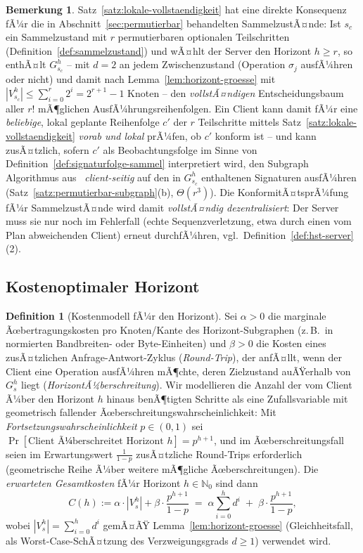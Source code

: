 ﻿\documentclass[a4paper,12pt]{article}
\theoremstyle{definition}
\newtheorem{definition}{Definition}
\newtheorem{bemerkung}{Bemerkung}
\begin{document}
\begin{bemerkung}
	\label{bem:hst-permutierbar}
	Satz~\ref{satz:lokale-vollstaendigkeit} hat eine direkte Konsequenz fÃ¼r die in
	Abschnitt~\ref{sec:permutierbar} behandelten SammelzustÃ¤nde: Ist $s_c$ ein
	Sammelzustand mit $r$ permutierbaren optionalen Teilschritten
	(Definition~\ref{def:sammelzustand}) und wÃ¤hlt der Server den Horizont $h\ge r$, so
	enthÃ¤lt $G_{s_c}^h$ -- mit $d=2$ an jedem Zwischenzustand (Operation $\sigma_j$
	ausfÃ¼hren oder nicht) und damit nach Lemma~\ref{lem:horizont-groesse} mit
	$|V_{s_c}^h|\le\sum_{i=0}^r 2^i=2^{r+1}-1$ Knoten -- den \emph{vollstÃ¤ndigen}
	Entscheidungsbaum aller $r!$ mÃ¶glichen AusfÃ¼hrungsreihenfolgen. Ein Client kann damit
	fÃ¼r eine \emph{beliebige}, lokal geplante Reihenfolge $c'$ der $r$ Teilschritte
	mittels Satz~\ref{satz:lokale-vollstaendigkeit} \emph{vorab und lokal} prÃ¼fen, ob
	$c'$ konform ist -- und kann zusÃ¤tzlich, sofern $c'$ als Beobachtungsfolge im Sinne
	von Definition~\ref{def:signaturfolge-sammel} interpretiert wird, den Subgraph
	Algorithmus aus~\cite{epp2026subgraph} \emph{client-seitig} auf den in $G_{s_c}^h$
	enthaltenen Signaturen ausfÃ¼hren (Satz~\ref{satz:permutierbar-subgraph}(b),
	$\Theta(r^3)$). Die KonformitÃ¤tsprÃ¼fung fÃ¼r SammelzustÃ¤nde wird damit
	\emph{vollstÃ¤ndig dezentralisiert}: Der Server muss sie nur noch im Fehlerfall (echte
	Sequenzverletzung, etwa durch einen vom Plan abweichenden Client) erneut
	durchfÃ¼hren, vgl.\ Definition~\ref{def:hst-server}(2).
\end{bemerkung}
\subsection{Kostenoptimaler Horizont}
\label{sec:hst-kosten}

\begin{definition}[Kostenmodell fÃ¼r den Horizont]
	\label{def:kostenmodell-horizont}
	Sei $\alpha>0$ die marginale Ãœbertragungskosten pro Knoten/Kante des
	Horizont-Subgraphen (z.\,B.\ in normierten Bandbreiten- oder Byte-Einheiten) und
	$\beta>0$ die Kosten eines zusÃ¤tzlichen Anfrage-Antwort-Zyklus
	(\emph{Round-Trip}), der anfÃ¤llt, wenn der Client eine Operation ausfÃ¼hren mÃ¶chte,
	deren Zielzustand auÃŸerhalb von $G_s^h$ liegt (\emph{HorizontÃ¼berschreitung}). Wir
	modellieren die Anzahl der vom Client Ã¼ber den Horizont $h$ hinaus benÃ¶tigten
	Schritte als eine Zufallsvariable mit geometrisch fallender Ãœberschreitungswahrscheinlichkeit:
	Mit \emph{Fortsetzungswahrscheinlichkeit} $p\in(0,1)$ sei
	$\Pr[\text{Client Ã¼berschreitet Horizont }h] = p^{h+1}$, und im Ãœberschreitungsfall
	seien im Erwartungswert $\frac{1}{1-p}$ zusÃ¤tzliche Round-Trips erforderlich
	(geometrische Reihe Ã¼ber weitere mÃ¶gliche Ãœberschreitungen). Die \emph{erwarteten
	Gesamtkosten} fÃ¼r Horizont $h\in\mathbb{N}_0$ sind dann
	\[
		C(h) := \alpha\cdot|V_s^h| + \beta\cdot\frac{p^{h+1}}{1-p}
		     \;=\; \alpha\sum_{i=0}^{h} d^i \;+\; \beta\cdot\frac{p^{h+1}}{1-p},
	\]
	wobei $|V_s^h|=\sum_{i=0}^h d^i$ gemÃ¤ÃŸ Lemma~\ref{lem:horizont-groesse}
	(Gleichheitsfall, als Worst-Case-SchÃ¤tzung des Verzweigungsgrads $d\ge1$) verwendet
	wird.
\end{definition}
\end{document}
